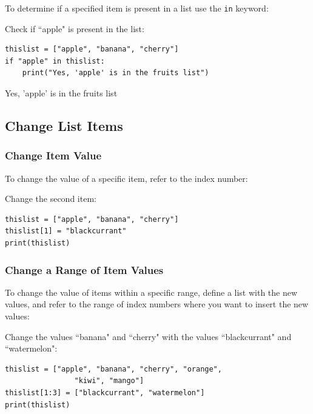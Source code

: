 \documentclass[12pt,a4paper]{article}
\newcommand{\code}[1]{%
	\colorbox{backcolour}{\lstinline{#1}}%
}
\begin{document}
To determine if a specified item is present in a list use the \code{in} keyword:

\begin{ebox}
Check if ``apple" is present in the list:
	\begin{lstlisting}
thislist = ["apple", "banana", "cherry"]
if "apple" in thislist:
    print("Yes, 'apple' is in the fruits list")
	\end{lstlisting}
\tcblower
	\begin{vercode}
Yes, 'apple' is in the fruits list
	\end{vercode}
\end{ebox}
\subsection{Change List Items}
\subsubsection{Change Item Value}

To change the value of a specific item, refer to the index number:

\begin{ebox}
Change the second item:
	\begin{lstlisting}
thislist = ["apple", "banana", "cherry"]
thislist[1] = "blackcurrant"
print(thislist)
	\end{lstlisting}
\tcblower
	\begin{vercode}
	\end{vercode}
\end{ebox}
\subsubsection{Change a Range of Item Values}

To change the value of items within a specific range, define a list with the
new values, and refer to the range of index numbers where you want to insert
the new values:

\begin{ebox}
Change the values ``banana" and ``cherry" with the values ``blackcurrant" and ``watermelon":
	\begin{lstlisting}
thislist = ["apple", "banana", "cherry", "orange",
                "kiwi", "mango"]
thislist[1:3] = ["blackcurrant", "watermelon"]
print(thislist)
	\end{lstlisting}
\tcblower
	\begin{vercode}
	\end{vercode}
\end{ebox}
\end{document}
